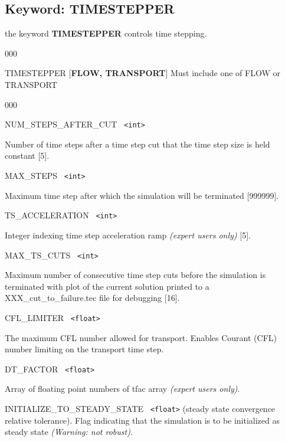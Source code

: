\hyperlink{target_key}{\return}


\newpage
\protect\hypertarget{target_timestep}{}

\subsection{Keyword: TIMESTEPPER}

 the keyword {\bf TIMESTEPPER} controls time stepping.

\hfill
\hyperlink{target_key}{\return}

\begin{deflist}{000}
\item[TIMESTEPPER] [{\bf FLOW, TRANSPORT}] Must include one of FLOW or TRANSPORT
\begin{deflist}{000}
\item[NUM\_STEPS\_AFTER\_CUT] \ {\tt <int>} 

Number of time steps after a time step cut that the time step size is held constant [5].

\item[MAX\_STEPS] \ {\tt <int>} 

Maximum time step after which the simulation will be terminated [999999].

\item[TS\_ACCELERATION] \ {\tt <int>} 

Integer indexing time step acceleration ramp {\em (expert users only)} [5].

\item[MAX\_TS\_CUTS] \ {\tt <int>} 

Maximum number of consecutive time step cuts before the simulation is terminated with plot of the current solution printed to a XXX\_cut\_to\_failure.tec file for debugging [16].

\item[CFL\_LIMITER] \ {\tt <float>}

The maximum CFL number allowed for transport. Enables Courant (CFL) number limiting on the transport time step.

\item[DT\_FACTOR] \ {\tt <float>} 

Array of floating point numbers of tfac array {\em (expert users only)}.

\item[INITIALIZE\_TO\_STEADY\_STATE] \ {\tt <float>} (steady state convergence relative tolerance).
Flag indicating that the simulation is to be initialized as steady state {\em (Warning: not robust)}.


\end{deflist}
\end{deflist}
